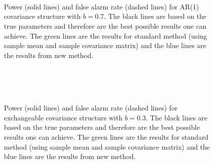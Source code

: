 \begin{figure}[htp]
\centering
{}
\\
\\
\\
\caption{Power (solid lines) and false alarm rate (dashed lines) for AR(1) covariance structure with $b=0.7$. The black lines are based on the true parameters and therefore are the best possible results one can achieve. The green lines are the results for standard method (using sample mean and sample covariance matrix) and the blue lines are the results from new method.\label{sup.4}}
\end{figure}

\begin{figure}[htp]
\centering
{}
\\
\\
\\
\caption{Power (solid lines) and false alarm rate (dashed lines) for exchangeable covariance structure with $b=0.3$. The black lines are based on the true parameters and therefore are the best possible results one can achieve. The green lines are the results for standard method (using sample mean and sample covariance matrix) and the blue lines are the results from new method.        
\label{sup.5}}
\end{figure}

